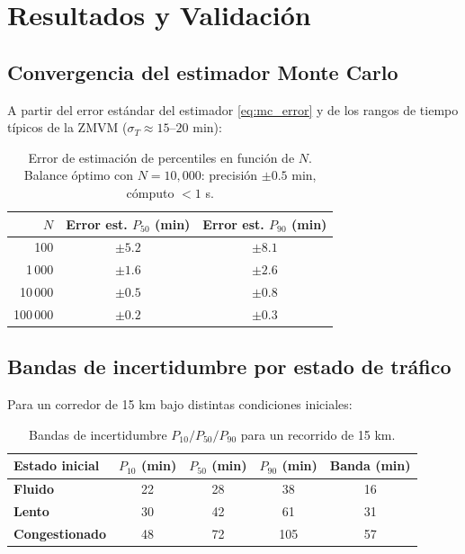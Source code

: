 \documentclass[12pt, a4paper]{article}
\theoremstyle{definition}
\begin{document}
\section{Resultados y Validación}

\subsection{Convergencia del estimador Monte Carlo}

A partir del error estándar del estimador \eqref{eq:mc_error} y de los rangos
de tiempo típicos de la ZMVM ($\sigma_T \approx 15$–$20$ min):

\begin{table}[h!]
\centering
\renewcommand{\arraystretch}{1.3}
\begin{tabular}{rcc}
\toprule
$N$ & Error est. $P_{50}$ (min) & Error est. $P_{90}$ (min) \\
\midrule
100       & $\pm 5.2$ & $\pm 8.1$ \\
1\,000    & $\pm 1.6$ & $\pm 2.6$ \\
10\,000   & $\pm 0.5$ & $\pm 0.8$ \\
100\,000  & $\pm 0.2$ & $\pm 0.3$ \\
\bottomrule
\end{tabular}
\caption{Error de estimación de percentiles en función de $N$. Balance óptimo
         con $N = 10{,}000$: precisión $\pm 0.5$ min, cómputo $< 1$ s.}
\end{table}

\subsection{Bandas de incertidumbre por estado de tráfico}

Para un corredor de 15 km bajo distintas condiciones iniciales:

\begin{table}[h!]
\centering
\renewcommand{\arraystretch}{1.3}
\begin{tabular}{lcccc}
\toprule
\textbf{Estado inicial} & $P_{10}$ (min) & $P_{50}$ (min) & $P_{90}$ (min) & Banda (min) \\
\midrule
\textcolor{fluido}{\textbf{Fluido}}               & 22 & 28 & 38 & 16 \\
\textcolor{lento}{\textbf{Lento}}                 & 30 & 42 & 61 & 31 \\
\textcolor{congestionado}{\textbf{Congestionado}} & 48 & 72 & 105 & 57 \\
\bottomrule
\end{tabular}
\caption{Bandas de incertidumbre $P_{10}/P_{50}/P_{90}$ para un recorrido de 15 km.}
\end{table}
\end{document}

